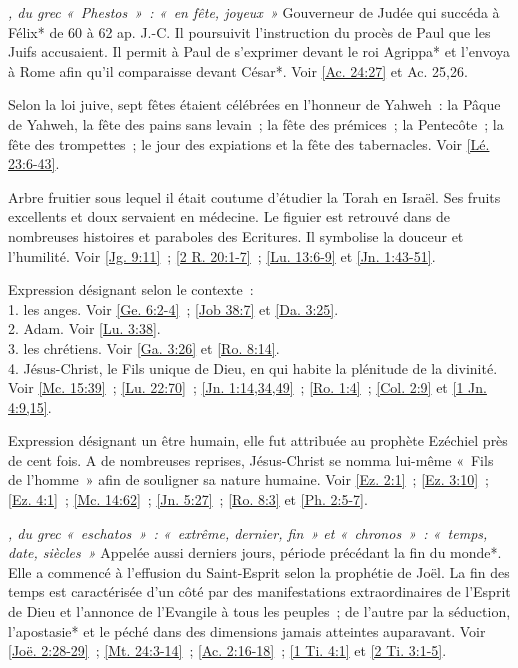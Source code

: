 \begin{multicols}{2}
\textit{, du grec «~Phestos~»~: «~en fête, joyeux~»}\newline
Gouverneur de Judée qui succéda à Félix* de 60 à 62 ap. J.-C. Il poursuivit l'instruction du procès de Paul que les Juifs accusaient. Il permit à Paul de s'exprimer devant le roi Agrippa* et l'envoya à Rome afin qu'il comparaisse devant César*. Voir \vref{Ac. 24:27} et Ac. 25,26.

\textit{}\newline
Selon la loi juive, sept fêtes étaient célébrées en l'honneur de Yahweh~: la Pâque de Yahweh, la fête des pains sans levain~; la fête des prémices~; la Pentecôte~; la fête des trompettes~; le jour des expiations et la fête des tabernacles. Voir \vref{Lé. 23:6-43}.

\textit{}\newline
Arbre fruitier sous lequel il était coutume d'étudier la Torah en Israël. Ses fruits excellents et doux servaient en médecine. Le figuier est retrouvé dans de nombreuses histoires et paraboles des Ecritures. Il symbolise la douceur et l'humilité. Voir \vref{Jg. 9:11}~; \vref{2 R. 20:1-7}~; \vref{Lu. 13:6-9} et \vref{Jn. 1:43-51}.

\textit{}\newline
Expression désignant selon le contexte~:
\\1. les anges. Voir \vref{Ge. 6:2-4}~; \vref{Job 38:7} et \vref{Da. 3:25}.
\\2. Adam. Voir \vref{Lu. 3:38}.
\\3. les chrétiens. Voir \vref{Ga. 3:26} et \vref{Ro. 8:14}.
\\4. Jésus-Christ, le Fils unique de Dieu, en qui habite la plénitude de la divinité. Voir \vref{Mc. 15:39}~; \vref{Lu. 22:70}~; \vref{Jn. 1:14,34,49}~; \vref{Ro. 1:4}~; \vref{Col. 2:9} et \vref{1 Jn. 4:9,15}.

\textit{}\newline
Expression désignant un être humain, elle fut attribuée au prophète Ezéchiel près de cent fois. A de nombreuses reprises, Jésus-Christ se nomma lui-même «~Fils de l'homme~» afin de souligner sa nature humaine. Voir \vref{Ez. 2:1}~; \vref{Ez. 3:10}~; \vref{Ez. 4:1}~; \vref{Mc. 14:62}~; \vref{Jn. 5:27}~; \vref{Ro. 8:3} et \vref{Ph. 2:5-7}.

\textit{, du grec «~eschatos~»~: «~extrême, dernier, fin~» et «~chronos~»~: «~temps, date, siècles~»}\newline
Appelée aussi derniers jours, période précédant la fin du monde*. Elle a commencé à l'effusion du Saint-Esprit selon la prophétie de Joël. La fin des temps est caractérisée d'un côté par des manifestations extraordinaires de l'Esprit de Dieu et l'annonce de l'Evangile à tous les peuples~; de l'autre par la séduction, l'apostasie* et le péché dans des dimensions jamais atteintes auparavant. Voir \vref{Joë. 2:28-29}~; \vref{Mt. 24:3-14}~; \vref{Ac. 2:16-18}~; \vref{1 Ti. 4:1} et \vref{2 Ti. 3:1-5}.


\end{multicols}
